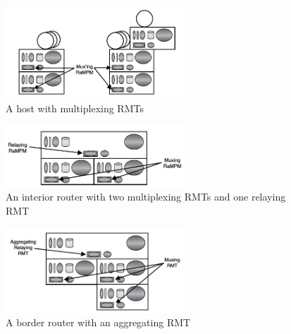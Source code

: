            \begin{figure}[H]
                \begin{center}
                    \includegraphics[width=0.6\textwidth]{fig/fwding_rmt-mux.png}
                  \caption{A host with multiplexing RMTs}
                  \label{fig:rina:rmt:mux}
                \end{center}
            \end{figure}
            \begin{figure}[H]
                \begin{center}
                    \includegraphics[width=0.6\textwidth]{fig/fwding_rmt-relay.png}
                  \caption{An interior router with two multiplexing RMTs and one relaying RMT}
                  \label{fig:rina:rmt:relay}
                \end{center}
            \end{figure}
            \begin{figure}[H]
                \begin{center}
                    \includegraphics[width=0.6\textwidth]{fig/fwding_rmt-agg.png}
                  \caption{A border router with an aggregating RMT}
                  \label{fig:rina:rmt:agg}
                \end{center}
            \end{figure}

